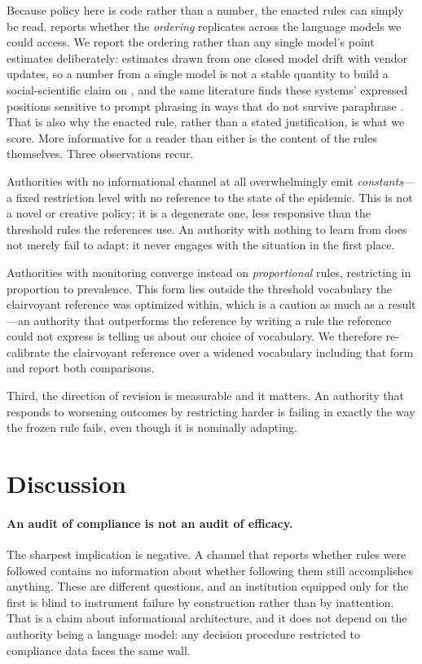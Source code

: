 \documentclass[11pt]{article}
\begin{document}
Because policy here is code rather than a number, the enacted rules can simply be read.
 reports whether the \emph{ordering} replicates across the language models we
could access. We report the ordering rather than any single model's point estimates deliberately:
estimates drawn from one closed model drift with vendor updates, so a number from a single model is
not a stable quantity to build a social-scientific claim on \citep{bisbee2024synthetic}, and the same
literature finds these systems' expressed positions sensitive to prompt phrasing in ways that do not
survive paraphrase \citep{rottger2024political}. That is also why the enacted rule, rather than a
stated justification, is what we score. More informative for a reader than either is the content of
the rules themselves. Three observations recur.

Authorities with no informational channel at all overwhelmingly emit \emph{constants}---a fixed
restriction level with no reference to the state of the epidemic. This is not a novel or creative
policy; it is a degenerate one, less responsive than the threshold rules the references use. An
authority with nothing to learn from does not merely fail to adapt: it never engages with the
situation in the first place.

Authorities with monitoring converge instead on \emph{proportional} rules, restricting in proportion
to prevalence. This form lies outside the threshold vocabulary the clairvoyant reference was
optimized within, which is a caution as much as a result---an authority that outperforms the
reference by writing a rule the reference could not express is telling us about our choice of
vocabulary. We therefore re-calibrate the clairvoyant reference over a widened vocabulary including
that form and report both comparisons.

Third, the direction of revision is measurable and it matters. An authority that responds to
worsening outcomes by restricting harder is failing in exactly the way the frozen rule fails, even
though it is nominally adapting.



\section{Discussion}

\paragraph{An audit of compliance is not an audit of efficacy.} The sharpest implication is
negative. A channel that reports whether rules were followed contains no information about whether
following them still accomplishes anything. These are different questions, and an institution
equipped only for the first is blind to instrument failure by construction rather than by
inattention. That is a claim about informational architecture, and it does not depend on the
authority being a language model: any decision procedure restricted to compliance data faces the
same wall.
\end{document}
